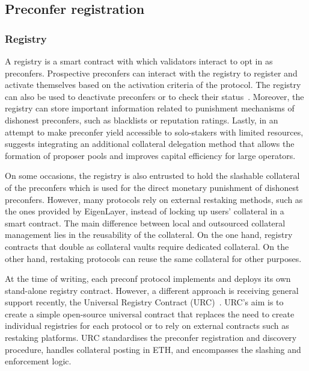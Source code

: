 \documentclass[conference]{IEEEtran}
\theoremstyle{boldstyle}
\begin{document}
    \subsection{Preconfer registration}
        \subsubsection{Registry}
        A registry is a smart contract with which validators interact to opt in as preconfers. Prospective preconfers can interact with the registry to register and activate themselves based on the activation criteria of the protocol. The registry can also be used to deactivate preconfers or to check their status~\cite{W:SequencerOpt-InDiscoveryandCommunication}. Moreover, the registry can store important information related to punishment mechanisms of dishonest preconfers, such as blacklists or reputation ratings. Lastly, in an attempt to make preconfer yield accessible to solo-stakers with limited resources, \cite{W:CrediblyNeutralPreconfirmationCollateral:ThePreconfirmationRegistry} suggests integrating an additional collateral delegation method that allows the formation of proposer pools and improves capital efficiency for large operators.
        
        On some occasions, the registry is also entrusted to hold the slashable collateral of the preconfers which is used for the direct monetary punishment of dishonest preconfers. However, many protocols rely on external restaking methods, such as the ones provided by EigenLayer, instead of locking up users' collateral in a smart contract. The main difference between local and outsourced collateral management lies in the reusability of the collateral. On the one hand, registry contracts that double as collateral vaults require dedicated collateral. On the other hand, restaking protocols can reuse the same collateral for other purposes.
        
        At the time of writing, each preconf protocol implements and deploys its own stand-alone registry contract. However, a different approach is receiving general support recently, the Universal Registry Contract (URC)~\cite{W:UniversalRegistryContract}. URC's aim is to create a simple open-source universal contract that replaces the need to create individual registries for each protocol or to rely on external contracts such as restaking platforms. URC standardises the preconfer registration and discovery procedure, handles collateral posting in ETH, and encompasses the slashing and enforcement logic.
\end{document}
